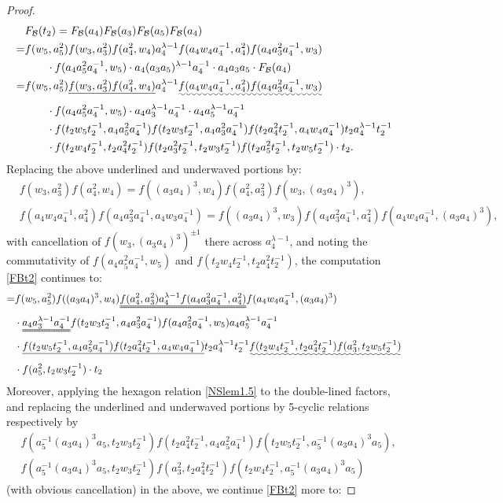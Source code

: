\documentclass[a4paper,10pt,reqno]{amsart}
\newcommand\FB{F_{\mathcal{B}}}
\begin{document}
\begin{proof}
\begin{align}
&\FB(t_2)=\FB(a_4)\FB(a_3)\FB(a_5)\FB(a_4) 
\label{FBt2}
\\
=&
f(w_5,a_5^2) 
{f(w_3,a_3^2) f(a_4^2,w_4)} 
a_4^{\lambda-1}
{
f(a_4w_4a_4^{-1},a_4^2)f(a_4a_3^2a_4^{-1},w_3)
} 
\nonumber\\ &{\qquad}\cdot f(a_4a_5^2a_4^{-1},w_5)\cdot 
a_4(a_3a_5)^{\lambda-1}a_4^{-1}\cdot a_4a_3a_5\cdot \FB(a_4) \nonumber\\
=&
f(w_5,a_5^2) \underline{f(w_3,a_3^2) f(a_4^2,w_4)} 
a_4^{\lambda-1}
\uwave{f(a_4w_4a_4^{-1},a_4^2)f(a_4a_3^2a_4^{-1},w_3)} \nonumber\\ 
&{\qquad}\cdot 
{f(a_4a_5^2a_4^{-1},w_5)}
\cdot 
a_4a_3^{\lambda-1}a_4^{-1}\cdot
{a_4a_5^{\lambda-1}a_4^{-1}}
\nonumber \\
&\qquad\cdot
{f(t_2w_5t_2^{-1},a_4a_5^2a_4^{-1})} f(t_2w_3t_2^{-1},a_4a_3^2a_4^{-1}) f(t_2a_4^2t_2^{-1},a_4w_4a_4^{-1}) 
t_2a_4^{\lambda-1}t_2^{-1} \nonumber \\
&{\qquad}\cdot
f(t_2w_4t_2^{-1},t_2a_4^2t_2^{-1})
f(t_2a_3^2t_2^{-1},t_2w_3t_2^{-1})  f(t_2a_5^2t_2^{-1},t_2w_5t_2^{-1})\cdot t_2. 
\nonumber
\end{align}
Replacing the above underlined and underwaved portions 
by:
\begin{align}
\label{twoPentagon_t2}
&f(w_3,a_3^2) f(a_4^2,w_4)
= f((a_3a_4)^3,w_4)f(a_4^2,a_3^2)f(w_3,(a_3a_4)^3),
\\
&f(a_4w_4a_4^{-1},a_4^2)f(a_4a_3^2a_4^{-1},a_4w_3a_4^{-1})
=f((a_3a_4)^3,w_3) f(a_4a_3^2a_4^{-1},a_4^2)
f(a_4w_4a_4^{-1},(a_3a_4)^3),
\nonumber
\end{align}
with cancellation of $f(w_3,(a_3a_4)^3)^{\pm 1}$ there across
$a_4^{\lambda-1}$, and noting the commutativity of
${f(a_4a_5^2a_4^{-1},w_5)}$ and $f(t_2w_4t_2^{-1},t_2a_4^2t_2^{-1})$,
the computation \eqref{FBt2} continues
to:
\begin{align}
=&f(w_5,a_5^2)
f((a_3a_4)^3,w_4)
\uuline{f(a_4^2,a_3^2)a_4^{\lambda-1}
 f(a_4a_3^2a_4^{-1},a_4^2)}
f(a_4w_4a_4^{-1},(a_3a_4)^3) 
\\
&\cdot
\uuline{a_4a_3^{\lambda-1}a_4^{-1}}
f(t_2w_3t_2^{-1},a_4a_3^2a_4^{-1})
f(a_4a_5^2a_4^{-1},w_5)a_4a_5^{\lambda-1}a_4^{-1} 
\nonumber \\
&\cdot \underline{f(t_2w_5t_2^{-1},a_4a_5^2a_4^{-1})
f(t_2a_4^2t_2^{-1}, a_4w_4a_4^{-1})}
t_2a_4^{\lambda-1}t_2^{-1}
\uwave{f(t_2w_4t_2^{-1},t_2a_4^2t_2^{-1})
f(a_3^2,t_2w_5t_2^{-1})} \nonumber \\
&\cdot
f(a_5^2,t_2w_3t_2^{-1})\cdot t_2
\nonumber
\end{align}
Moreover, applying the hexagon relation
\eqref{NSlem1.5}
to the double-lined factors,  and replacing 
the underlined and underwaved portions 
by 5-cyclic relations 
respectively by 
\begin{align*}
&f(a_5^{-1}(a_3a_4)^3a_5,t_2w_3t_2^{-1})
f(t_2a_4^2t_2^{-1},a_4a_5^2a_4^{-1})
f(t_2w_5t_2^{-1},a_5^{-1}(a_3a_4)^3a_5), \\
&f(a_5^{-1}(a_3a_4)^3a_5,t_2w_3t_2^{-1})
f(a_3^2,t_2a_4^2t_2^{-1})
f(t_2w_4t_2^{-1},a_5^{-1}(a_3a_4)^3a_5)
\end{align*}
(with obvious cancellation) in the above, 
we continue
\eqref{FBt2} more to:



\end{proof}
\end{document}

